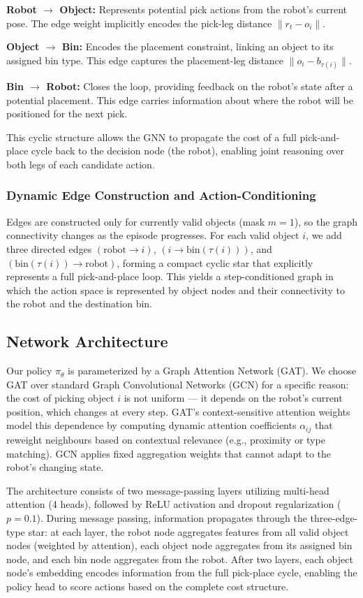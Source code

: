 \documentclass[conference]{IEEEtran}
\begin{document}
\textbf{Robot $\to$ Object:} Represents potential pick actions from the robot's current pose. The edge weight implicitly encodes the pick-leg distance $\lVert r_t - o_i \rVert$.

\textbf{Object $\to$ Bin:} Encodes the placement constraint, linking an object to its assigned bin type. This edge captures the placement-leg distance $\lVert o_i - b_{\tau(i)} \rVert$.

\textbf{Bin $\to$ Robot:} Closes the loop, providing feedback on the robot's state after a potential placement. This edge carries information about where the robot will be positioned for the next pick.

This cyclic structure allows the GNN to propagate the cost of a full pick-and-place cycle back to the decision node (the robot), enabling joint reasoning over both legs of each candidate action.

\subsubsection{Dynamic Edge Construction and Action-Conditioning}
Edges are constructed only for currently valid objects (mask $m=1$), so the graph connectivity changes as the episode progresses.
For each valid object $i$, we add three directed edges $(\text{robot}\rightarrow i)$, $(i \rightarrow \text{bin}(\tau(i)))$, and $(\text{bin}(\tau(i)) \rightarrow \text{robot})$, forming a compact cyclic star that explicitly represents a full pick-and-place loop.
This yields a step-conditioned graph in which the action space is represented by object nodes and their connectivity to the robot and the destination bin.

\subsection{Network Architecture}
Our policy $\pi_\theta$ is parameterized by a Graph Attention Network (GAT). We choose GAT over standard Graph Convolutional Networks (GCN) for a specific reason: the cost of picking object $i$ is not uniform --- it depends on the robot's current position, which changes at every step. GAT's context-sensitive attention weights model this dependence by computing dynamic attention coefficients $\alpha_{ij}$ that reweight neighbours based on contextual relevance (e.g., proximity or type matching). GCN applies fixed aggregation weights that cannot adapt to the robot's changing state.

The architecture consists of two message-passing layers utilizing multi-head attention (4 heads), followed by ReLU activation and dropout regularization ($p=0.1$). During message passing, information propagates through the three-edge-type star: at each layer, the robot node aggregates features from all valid object nodes (weighted by attention), each object node aggregates from its assigned bin node, and each bin node aggregates from the robot. After two layers, each object node's embedding encodes information from the full pick-place cycle, enabling the policy head to score actions based on the complete cost structure.
\end{document}
